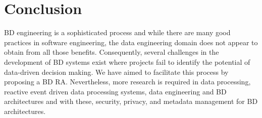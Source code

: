 \documentclass[a4paper,11pt]{article}
\begin{document}
\section{Conclusion}
 \nobreak{}
BD engineering is a sophisticated process and while there are many good practices in software engineering, the data engineering domain does not appear to obtain from all those benefits. Consequently, several challenges in the development of BD systems exist where projects fail to identify the potential of data-driven decision making. We have aimed to facilitate this process by proposing a BD RA. Nevertheless, more research is required in  data processing, reactive event driven data processing systems, data engineering and BD architectures and with these, security, privacy, and metadata management for BD architectures.




\end{document}
